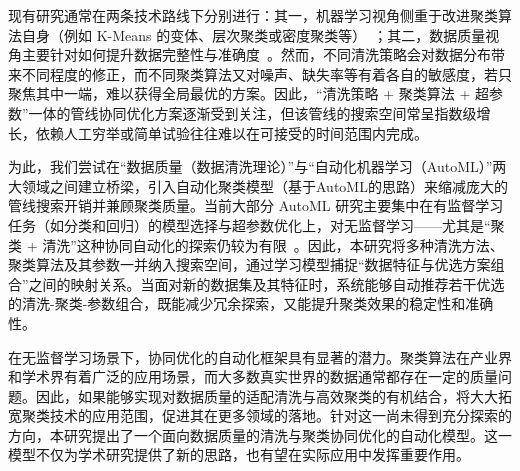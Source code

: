 \documentclass[10pt]{article} %
\numberwithin{equation}{section}
\begin{document}
现有研究通常在两条技术路线下分别进行：其一，机器学习视角侧重于改进聚类算法自身（例如 K-Means 的变体、层次聚类或密度聚类等）~\cite{ref8, ref9, ref10}；其二，数据质量视角主要针对如何提升数据完整性与准确度~\cite{ref11, ref12}。然而，不同清洗策略会对数据分布带来不同程度的修正，而不同聚类算法又对噪声、缺失率等有着各自的敏感度，若只聚焦其中一端，难以获得全局最优的方案。因此，“清洗策略 + 聚类算法 + 超参数”一体的管线协同优化方案逐渐受到关注，但该管线的搜索空间常呈指数级增长，依赖人工穷举或简单试验往往难以在可接受的时间范围内完成。

为此，我们尝试在“数据质量（数据清洗理论）”与“自动化机器学习（AutoML）”两大领域之间建立桥梁，引入自动化聚类模型（基于AutoML的思路）来缩减庞大的管线搜索开销并兼顾聚类质量。当前大部分 AutoML 研究主要集中在有监督学习任务（如分类和回归）的模型选择与超参数优化上，对无监督学习——尤其是“聚类 + 清洗”这种协同自动化的探索仍较为有限~\cite{ref13, ref14}。因此，本研究将多种清洗方法、聚类算法及其参数一并纳入搜索空间，通过学习模型捕捉“数据特征与优选方案组合”之间的映射关系。当面对新的数据集及其特征时，系统能够自动推荐若干优选的清洗-聚类-参数组合，既能减少冗余探索，又能提升聚类效果的稳定性和准确性。

在无监督学习场景下，协同优化的自动化框架具有显著的潜力。聚类算法在产业界和学术界有着广泛的应用场景，而大多数真实世界的数据通常都存在一定的质量问题。因此，如果能够实现对数据质量的适配清洗与高效聚类的有机结合，将大大拓宽聚类技术的应用范围，促进其在更多领域的落地。针对这一尚未得到充分探索的方向，本研究提出了一个面向数据质量的清洗与聚类协同优化的自动化模型。这一模型不仅为学术研究提供了新的思路，也有望在实际应用中发挥重要作用。
\end{document}
